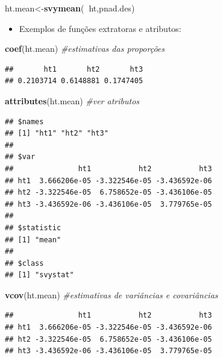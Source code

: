\documentclass[]{book}
\newenvironment{Shaded}{\begin{snugshade}}{\end{snugshade}}
\newcommand{\KeywordTok}[1]{\textcolor[rgb]{0.13,0.29,0.53}{\textbf{#1}}}
\newcommand{\CommentTok}[1]{\textcolor[rgb]{0.56,0.35,0.01}{\textit{#1}}}
\newcommand{\OperatorTok}[1]{\textcolor[rgb]{0.81,0.36,0.00}{\textbf{#1}}}
\newcommand{\NormalTok}[1]{#1}
\providecommand{\tightlist}{%
  \setlength{\itemsep}{0pt}\setlength{\parskip}{0pt}}
\theoremstyle{definition}
\theoremstyle{definition}
\theoremstyle{definition}
\theoremstyle{remark}
\begin{document}
\begin{Shaded}
\begin{Highlighting}[]
\NormalTok{ht.mean<-}\KeywordTok{svymean}\NormalTok{(}\OperatorTok{~}\NormalTok{ht,pnad.des)}
\end{Highlighting}
\end{Shaded}

\begin{itemize}
\tightlist
\item
  Exemplos de funções extratoras e atributos:
\end{itemize}

\begin{Shaded}
\begin{Highlighting}[]
\KeywordTok{coef}\NormalTok{(ht.mean)                         }\CommentTok{#estimativas das proporções}
\end{Highlighting}
\end{Shaded}

\begin{verbatim}
##       ht1       ht2       ht3 
## 0.2103714 0.6148881 0.1747405
\end{verbatim}

\begin{Shaded}
\begin{Highlighting}[]
\KeywordTok{attributes}\NormalTok{(ht.mean)                          }\CommentTok{#ver atributos}
\end{Highlighting}
\end{Shaded}

\begin{verbatim}
## $names
## [1] "ht1" "ht2" "ht3"
## 
## $var
##               ht1           ht2           ht3
## ht1  3.666206e-05 -3.322546e-05 -3.436592e-06
## ht2 -3.322546e-05  6.758652e-05 -3.436106e-05
## ht3 -3.436592e-06 -3.436106e-05  3.779765e-05
## 
## $statistic
## [1] "mean"
## 
## $class
## [1] "svystat"
\end{verbatim}

\begin{Shaded}
\begin{Highlighting}[]
\KeywordTok{vcov}\NormalTok{(ht.mean)                         }\CommentTok{#estimativas de variâncias e covariâncias}
\end{Highlighting}
\end{Shaded}

\begin{verbatim}
##               ht1           ht2           ht3
## ht1  3.666206e-05 -3.322546e-05 -3.436592e-06
## ht2 -3.322546e-05  6.758652e-05 -3.436106e-05
## ht3 -3.436592e-06 -3.436106e-05  3.779765e-05
\end{verbatim}
\end{document}
